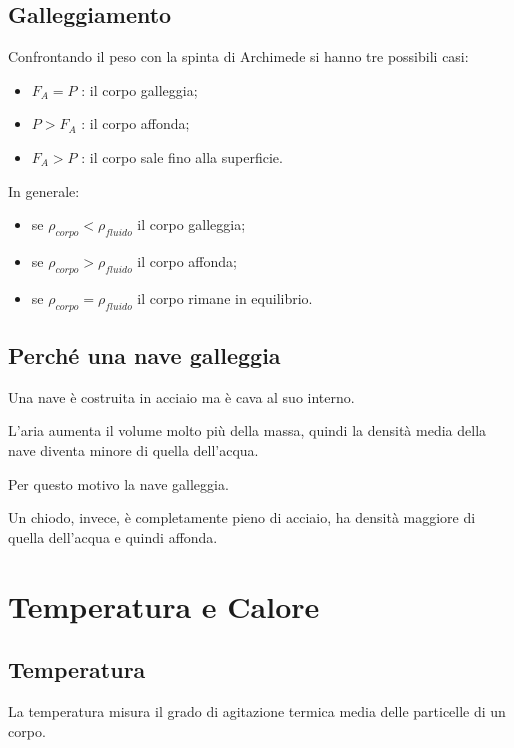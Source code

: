 \subsection{Galleggiamento}

Confrontando il peso con la spinta di Archimede si hanno tre possibili casi:

\begin{itemize}
    \item $F_A=P$ : il corpo galleggia;
    \item $P>F_A$ : il corpo affonda;
    \item $F_A>P$ : il corpo sale fino alla superficie.
\end{itemize}

In generale:

\begin{itemize}
    \item se $\rho_{corpo}<\rho_{fluido}$ il corpo galleggia;
    \item se $\rho_{corpo}>\rho_{fluido}$ il corpo affonda;
    \item se $\rho_{corpo}=\rho_{fluido}$ il corpo rimane in equilibrio.
\end{itemize}

\subsection{Perché una nave galleggia}

Una nave è costruita in acciaio ma è cava al suo interno.

\noindent L'aria aumenta il volume molto più della massa, quindi la densità media della nave diventa minore di quella dell'acqua.

\noindent Per questo motivo la nave galleggia.

\noindent Un chiodo, invece, è completamente pieno di acciaio, ha densità maggiore di quella dell'acqua e quindi affonda.

\section{Temperatura e Calore}

\subsection{Temperatura}

La temperatura misura il grado di agitazione termica media delle particelle di un corpo.

